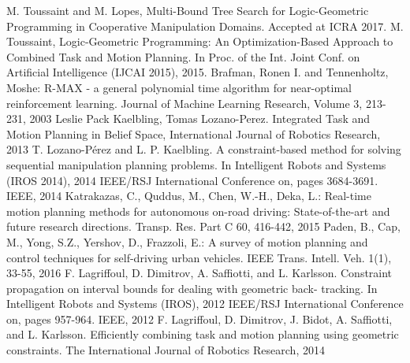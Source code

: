 \documentclass[conference]{IEEEtran}
\begin{document}
\begin{thebibliography}{99}

 M. Toussaint and M. Lopes, Multi-Bound Tree Search for Logic-Geometric Programming in Cooperative Manipulation Domains. Accepted at ICRA 2017.
 M. Toussaint, Logic-Geometric Programming: An Optimization-Based Approach to Combined Task and Motion Planning. In Proc. of the Int. Joint Conf. on Artificial Intelligence (IJCAI 2015), 2015.
 Brafman, Ronen I. and Tennenholtz, Moshe: {R-MAX} - a general polynomial time algorithm for near-optimal reinforcement learning. Journal of Machine Learning Research, Volume 3, 213-231, 2003
 Leslie Pack Kaelbling, Tomas Lozano-Perez. Integrated Task and Motion Planning in Belief Space, International Journal of Robotics Research, 2013
 T. Lozano-Pérez and L. P. Kaelbling. A constraint-based method
for solving sequential manipulation planning problems. In Intelligent
Robots and Systems (IROS 2014), 2014 IEEE/RSJ International Conference on, pages 3684-3691. IEEE, 2014
 Katrakazas, C., Quddus, M., Chen, W.-H., Deka, L.: Real-time motion planning methods for autonomous on-road driving: State-of-the-art and future research directions. Transp. Res. Part C 60, 416-442, 2015
 Paden, B., Cap, M., Yong, S.Z., Yershov, D., Frazzoli, E.: A survey of motion planning and control techniques for self-driving urban vehicles. IEEE Trans. Intell. Veh. 1(1), 33-55, 2016
 F. Lagriffoul, D. Dimitrov, A. Saffiotti, and L. Karlsson. Constraint propagation on interval bounds for dealing with geometric back-
tracking. In Intelligent Robots and Systems (IROS), 2012 IEEE/RSJ
International Conference on, pages 957-964. IEEE, 2012
F. Lagriffoul, D. Dimitrov, J. Bidot, A. Saffiotti, and L. Karlsson.
Efficiently combining task and motion planning using geometric
constraints. The International Journal of Robotics Research, 2014
\end{thebibliography}
\end{document}
